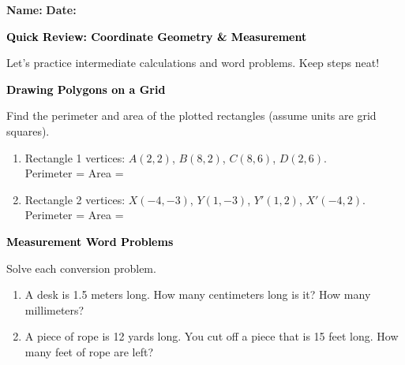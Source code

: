 \documentclass[12pt, letterpaper, fleqn]{article}
\newcommand{\blank}{\underline{\hspace{2.2cm}}}
\begin{document}
\textbf{Name:} \underline{\hspace{5cm}}
\hfill
\textbf{Date:} \underline{\hspace{3cm}}\\

\begin{tcolorbox}[colback=customteal!20]
    \large\textcolor{black}{\textbf{Quick Review: Coordinate Geometry \& Measurement}}
\end{tcolorbox}

\vspace{3mm}
\noindent
Let's practice intermediate calculations and word problems. Keep steps neat!

\vspace{4mm}

\begin{tcolorbox}[colback=customteal!20]
\large\textcolor{black}{\textbf{Drawing Polygons on a Grid}}
\end{tcolorbox}

\noindent
Find the perimeter and area of the plotted rectangles (assume units are grid squares).

\vspace{3mm}
\begin{enumerate}[itemsep=1.2cm, leftmargin=0.6cm]
\item Rectangle 1 vertices: $A(2, 2)$, $B(8, 2)$, $C(8, 6)$, $D(2, 6)$. \\ Perimeter = \blank \quad Area = \blank
\vspace{1cm}
\item Rectangle 2 vertices: $X(-4, -3)$, $Y(1, -3)$, $Y'(1, 2)$, $X'(-4, 2)$. \\ Perimeter = \blank \quad Area = \blank
\vspace{1cm}
\end{enumerate}
\newpage

\begin{tcolorbox}[colback=customteal!20]
\large\textcolor{black}{\textbf{Measurement Word Problems}}
\end{tcolorbox}

\noindent
Solve each conversion problem.

\vspace{3mm}
\begin{enumerate}[itemsep=1.2cm, leftmargin=0.6cm]
\item A desk is 1.5 meters long. How many centimeters long is it? How many millimeters?
\vspace{1cm}
\item A piece of rope is 12 yards long. You cut off a piece that is 15 feet long. How many feet of rope are left?
\vspace{1cm}
\end{enumerate}
\newpage
\end{document}
